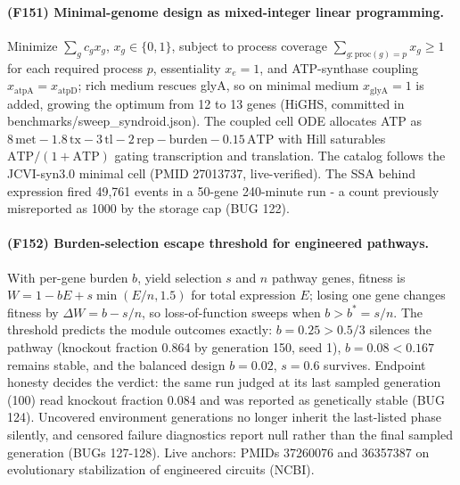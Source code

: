 \paragraph{(F151) Minimal-genome design as mixed-integer linear programming.} Minimize $\sum_g c_g x_g$, $x_g\in\{0,1\}$, subject to process coverage $\sum_{g:\mathrm{proc}(g)=p} x_g\ge 1$ for each required process $p$, essentiality $x_e=1$, and ATP-synthase coupling $x_{\mathrm{atpA}}=x_{\mathrm{atpD}}$; rich medium rescues glyA, so on minimal medium $x_{\mathrm{glyA}}=1$ is added, growing the optimum from 12 to 13 genes (HiGHS, committed in benchmarks/sweep\_syndroid.json). The coupled cell ODE allocates ATP as $8\,\mathrm{met}-1.8\,\mathrm{tx}-3\,\mathrm{tl}-2\,\mathrm{rep}-\mathrm{burden}-0.15\,\mathrm{ATP}$ with Hill saturables $\mathrm{ATP}/(1+\mathrm{ATP})$ gating transcription and translation. The catalog follows the JCVI-syn3.0 minimal cell (PMID 27013737, live-verified). The SSA behind expression fired 49{,}761 events in a 50-gene 240-minute run - a count previously misreported as 1000 by the storage cap (BUG 122).
\paragraph{(F152) Burden-selection escape threshold for engineered pathways.} With per-gene burden $b$, yield selection $s$ and $n$ pathway genes, fitness is $W=1-bE+s\min(E/n,1.5)$ for total expression $E$; losing one gene changes fitness by $\Delta W=b-s/n$, so loss-of-function sweeps when $b>b^{*}=s/n$. The threshold predicts the module outcomes exactly: $b=0.25>0.5/3$ silences the pathway (knockout fraction 0.864 by generation 150, seed 1), $b=0.08<0.167$ remains stable, and the balanced design $b=0.02$, $s=0.6$ survives. Endpoint honesty decides the verdict: the same run judged at its last sampled generation (100) read knockout fraction 0.084 and was reported as genetically stable (BUG 124). Uncovered environment generations no longer inherit the last-listed phase silently, and censored failure diagnostics report null rather than the final sampled generation (BUGs 127-128). Live anchors: PMIDs 37260076 and 36357387 on evolutionary stabilization of engineered circuits (NCBI).
